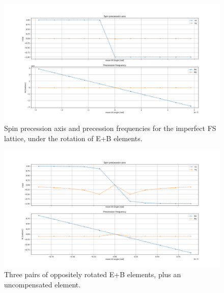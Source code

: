 \documentclass{article}
\begin{document}
\begin{figure}[h]
  \includegraphics[width=\textwidth]{img/linearity_test_shifting_gauss}
  \caption{Spin precession axis and precession frequencies for the imperfect FS lattice, under the rotation of E+B elements.\label{fig:Linearity_test_shifting_gauss}}
\end{figure}
\begin{figure}[h]
  \includegraphics[width=\textwidth]{img/linearity_test_compensated+microrad}
  \caption{Three pairs of oppositely rotated E+B elements, plus an uncompensated element.\label{fig:Linearity_test_compensated}}
\end{figure}




\end{document}
